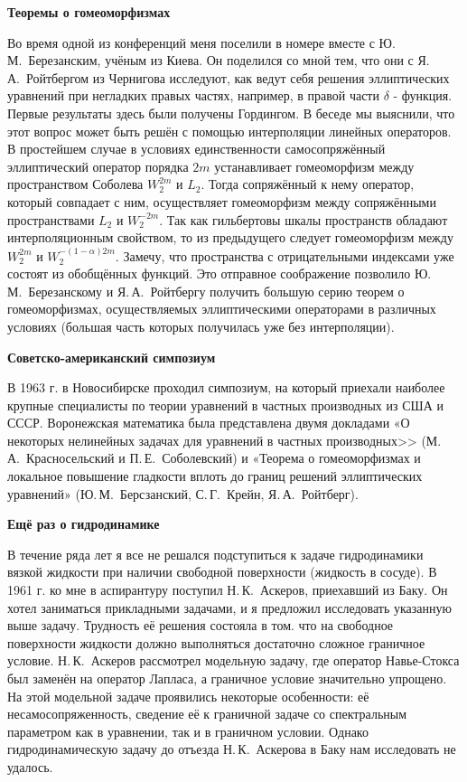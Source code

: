 {\bf Теоремы о гомеоморфизмах}

Во время одной из конференций меня поселили в номере вместе с Ю.\,М.~Березанским, учёным из Киева. Он поделился со мной тем, что они с Я.\,А.~Ройтбергом из Чернигова исследуют, как ведут себя решения эллиптических уравнений при негладких правых частях, например, в правой части $\delta$ - функция. Первые результаты здесь были получены Гордингом. В беседе мы выяснили, что этот вопрос может быть решён с помощью интерполяции линейных операторов. В простейшем случае в условиях единственности самосопряжённый эллиптический оператор порядка $2m$ устанавливает гомеоморфизм между пространством Соболева $W_2^{2m}$ и $L_2$. Тогда сопряжённый к нему оператор, который совпадает с ним, осуществляет гомеоморфизм между сопряжёнными пространствами $L_2$ и $W_2^{-2m}$. Так как гильбертовы шкалы пространств обладают интерполяционным свойством, то из предыдущего следует гомеоморфизм между $W_2^{2m}$ и $W_2^{-(1-\alpha)2m}$. Замечу, что пространства с отрицательными индексами уже состоят из обобщённых функций. Это отправное соображение позволило Ю.\,М.~Березанскому и Я.\,А.~Ройтбергу получить большую серию теорем о гомеоморфизмах, осуществляемых эллиптическими операторами в различных условиях (большая часть которых получилась уже без интерполяции).

{\bf Советско-американский симпозиум}

В 1963 г. в Новосибирске проходил симпозиум,
на который приехали наиболее крупные специалисты по теории уравнений в частных производных из США и СССР.
Воронежская математика была представлена двумя докладами «О некоторых нелинейных задачах для уравнений в частных производных>>
(М.\,А.~Красносельский и П.\,Е.~Соболевский) и «Теорема о гомеоморфизмах и локальное повышение гладкости вплоть до границ решений эллиптических уравнений»
 (Ю.\,М.~Берсзанский, С.\,Г.~Крейн, Я.\,А.~Ройтберг).

{\bf Ещё раз о гидродинамике}

В течение ряда лет я все не решался подступиться к задаче гидродинамики вязкой жидкости при наличии свободной поверхности (жидкость в сосуде). В 1961 г. ко мне в аспирантуру поступил Н.\,К.~Аскеров, приехавший из Баку. Он хотел заниматься прикладными задачами, и я предложил исследовать указанную выше задачу. Трудность её решения состояла в том. что на свободное поверхности жидкости должно выполняться достаточно сложное граничное условие. Н.\,К.~Аскеров рассмотрел модельную задачу, где оператор Навье-Стокса был заменён на оператор Лапласа, а граничное условие значительно упрощено. На этой модельной задаче проявились некоторые особенности: её несамосопряженность, сведение её к граничной задаче со спектральным параметром как в уравнении, так и в граничном условии. Однако гидродинамическую задачу до отъезда Н.\,К.~Аскерова в Баку нам исследовать не удалось.

